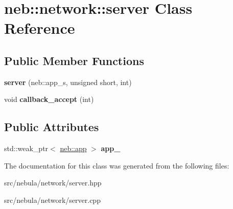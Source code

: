 \hypertarget{classneb_1_1network_1_1server}{\section{neb\-:\-:network\-:\-:server \-Class \-Reference}
\label{classneb_1_1network_1_1server}
}
\subsection*{\-Public \-Member \-Functions}
\begin{DoxyCompactItemize}
\item 
\hypertarget{classneb_1_1network_1_1server_a55eb2c80a90c0b5b6d858373b8162ec4}{{\bfseries server} (neb\-::app\-\_\-s, unsigned short, int)}\label{classneb_1_1network_1_1server_a55eb2c80a90c0b5b6d858373b8162ec4}

\item 
\hypertarget{classneb_1_1network_1_1server_a3abc21bea913d905137668449665e7c4}{void {\bfseries callback\-\_\-accept} (int)}\label{classneb_1_1network_1_1server_a3abc21bea913d905137668449665e7c4}

\end{DoxyCompactItemize}
\subsection*{\-Public \-Attributes}
\begin{DoxyCompactItemize}
\item 
\hypertarget{classneb_1_1network_1_1server_a878fe2bc88c7e06dcd6b88d6dc0a5983}{std\-::weak\-\_\-ptr$<$ \hyperlink{classneb_1_1app}{neb\-::app} $>$ {\bfseries app\-\_\-}}\label{classneb_1_1network_1_1server_a878fe2bc88c7e06dcd6b88d6dc0a5983}

\end{DoxyCompactItemize}


\-The documentation for this class was generated from the following files\-:\begin{DoxyCompactItemize}
\item 
src/nebula/network/server.\-hpp\item 
src/nebula/network/server.\-cpp\end{DoxyCompactItemize}
